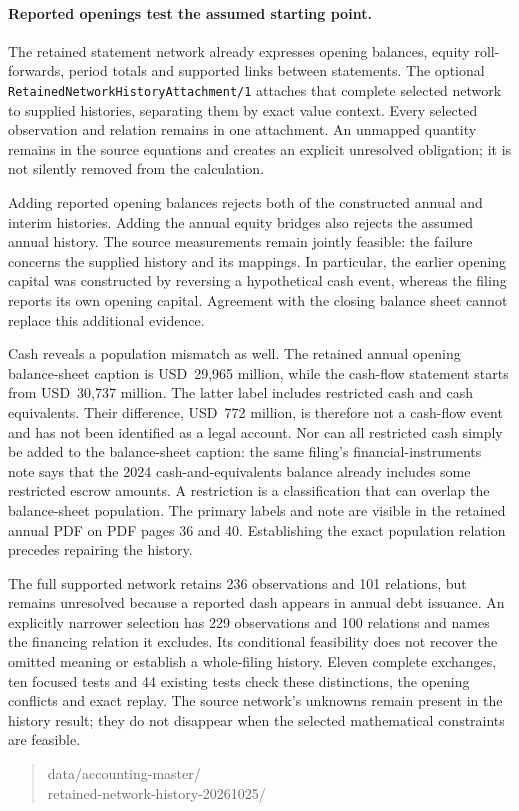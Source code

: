 \paragraph{Reported openings test the assumed starting point.}
The retained statement network already expresses opening balances, equity
roll-forwards, period totals and supported links between statements. The
optional \texttt{RetainedNetworkHistoryAttachment/1} attaches that complete
selected network to supplied histories, separating them by exact value
context. Every selected observation and relation remains in one attachment.
An unmapped quantity remains in the source equations and creates an explicit
unresolved obligation; it is not silently removed from the calculation.

Adding reported opening balances rejects both of the constructed annual and
interim histories. Adding the annual equity bridges also rejects the assumed
annual history. The source measurements remain jointly feasible: the failure
concerns the supplied history and its mappings. In particular, the earlier
opening capital was constructed by reversing a hypothetical cash event,
whereas the filing reports its own opening capital. Agreement with the closing
balance sheet cannot replace this additional evidence.

Cash reveals a population mismatch as well. The retained annual opening
balance-sheet caption is USD~29,965 million, while the cash-flow statement
starts from USD~30,737 million. The latter label includes restricted cash
and cash equivalents. Their difference, USD~772 million, is therefore not a
cash-flow event and has not been identified as a legal account. Nor can all
restricted cash simply be added to the balance-sheet caption: the same
filing's financial-instruments note says that the 2024 cash-and-equivalents
balance already includes some restricted escrow amounts. A restriction is a
classification that can overlap the balance-sheet population. The primary
labels and note are visible in the retained annual PDF on PDF pages 36 and
40. Establishing the exact population relation precedes repairing the history.

The full supported network retains 236 observations and 101 relations, but
remains unresolved because a reported dash appears in annual debt issuance.
An explicitly narrower selection has 229 observations and 100 relations and
names the financing relation it excludes. Its conditional feasibility does
not recover the omitted meaning or establish a whole-filing history. Eleven
complete exchanges, ten focused tests and 44 existing tests check these
distinctions, the opening conflicts and exact replay. The source network's
unknowns remain present in the history result; they do not disappear when
the selected mathematical constraints are feasible.
\begin{quote}\small\ttfamily
data/accounting-master/\\
retained-network-history-20261025/
\end{quote}
